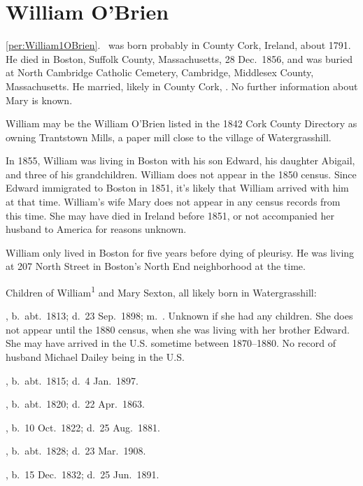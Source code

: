 \section{William O'Brien}

\ref{per:William1OBrien}.\  was born probably in County Cork, Ireland, about 1791.\cite{Census1855William} He died in Boston, Suffolk County, Massachusetts, 28 Dec.\ 1856,\cite{William1OBrienDeath} and was buried at North Cambridge Catholic Cemetery, Cambridge, Middlesex County, Massachusetts.\cite{DianaBerberenaLetter1} He married, likely in County Cork, .\cite{Michael2OBrienDeath,Abigail2OBrienDeath,Ann2OBrienDeath,Mary2OBrienDeath} No further information about Mary is known.

William may be the William O'Brien listed in the 1842 Cork County Directory as owning Trantstown Mills, a paper mill close to the village of Watergrasshill.\cite{Jacksons}

In 1855, William was living in Boston with his son Edward, his daughter Abigail, and three of his grandchildren.\cite{Census1855William} William does not appear in the 1850 census. Since Edward immigrated to Boston in 1851\cite{Edward2OBrienNaturalization}, it's likely that William arrived with him at that time. William's wife Mary does not appear in any census records from this time. She may have died in Ireland before 1851, or not accompanied her husband to America for reasons unknown.

William only lived in Boston for five years before dying of pleurisy. He was living at 207 North Street in Boston's North End neighborhood at the time.\cite{William1OBrienDeath}

\begin{KidsIntro}
	Children of William\textsuperscript{1} and Mary Sexton, all likely born in Watergrasshill:
\end{KidsIntro}

\begin{Kids}
	, b.\ abt.\ 1813\cite{1880CensusAnn}; d.\ 23 Sep.\ 1898; m.\ .\cite{Ann2OBrienDeath} Unknown if she had any children. She does not appear until the 1880 census, when she was living with her brother Edward. She may have arrived in the U.S. sometime between 1870--1880. No record of husband Michael Dailey being in the U.S.
	
	, b.\ abt.\ 1815; d.\ 4 Jan.\ 1897.
	
	, b.\ abt.\ 1820; d.\ 22 Apr.\ 1863.
	
	, b.\ 10 Oct.\ 1822; d.\ 25 Aug.\ 1881.
		
	, b.\ abt.\ 1828; d.\ 23 Mar.\ 1908.
	
	, b.\ 15 Dec.\ 1832; d.\ 25 Jun.\ 1891.
			
\end{Kids}

